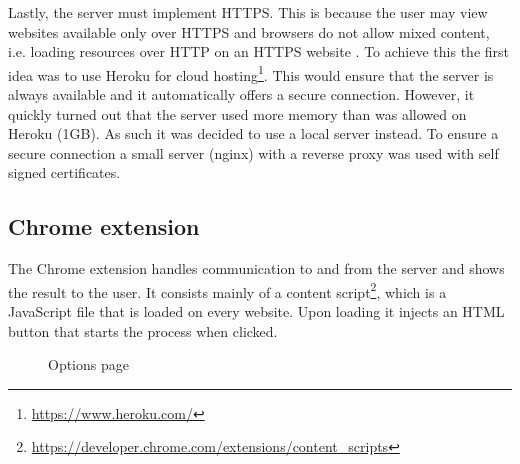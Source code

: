 Lastly, the server must implement HTTPS. This is because the user may view websites available only over HTTPS and browsers do not allow mixed content, i.e. loading resources over HTTP on an HTTPS website \cite{ChromeMixedContent}. To achieve this the first idea was to use Heroku for cloud hosting\footnote{\url{https://www.heroku.com/}}. This would ensure that the server is always available and it automatically offers a secure connection. However, it quickly turned out that the server used more memory than was allowed on Heroku (1GB). As such it was decided to use a local server instead. To ensure a secure connection a small server (nginx) with a reverse proxy was used with self signed certificates\cite{nginxReverseProxy}. 




\subsection{Chrome extension}
The Chrome extension handles communication to and from the server and shows the result to the user. It consists mainly of a content script\footnote{\url{https://developer.chrome.com/extensions/content_scripts}}, which is a JavaScript file that is loaded on every website. Upon loading it injects an HTML button that starts the process when clicked. 

\begin{figure}
  \caption{Options page}
  \label{fig:options}
\end{figure}

